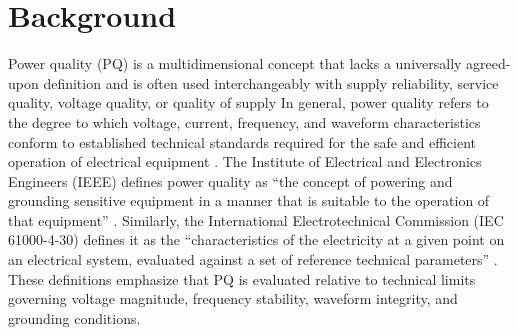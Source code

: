 \documentclass[review]{elsarticle}
\begin{document}


\section{Background}
\label{sec:Back}
Power quality (PQ) is a multidimensional concept that lacks a universally agreed-upon definition and is often used interchangeably with supply reliability, service quality, voltage quality, or quality of supply \cite{Bollen2000, Dugan2012} In general, power quality refers to the degree to which voltage, current, frequency, and waveform characteristics conform to established technical standards required for the safe and efficient operation of electrical equipment \cite{IEEE1159_2019}. The Institute of Electrical and Electronics Engineers (IEEE) defines power quality as “the concept of powering and grounding sensitive equipment in a manner that is suitable to the operation of that equipment” \cite{IEEE1100_2005}. Similarly, the International Electrotechnical Commission (IEC 61000-4-30) defines it as the “characteristics of the electricity at a given point on an electrical system, evaluated against a set of reference technical parameters” \cite{IEC61508_2010_CMV}. These definitions emphasize that PQ is evaluated relative to technical limits governing voltage magnitude, frequency stability, waveform integrity, and grounding conditions.
 
\end{document}
